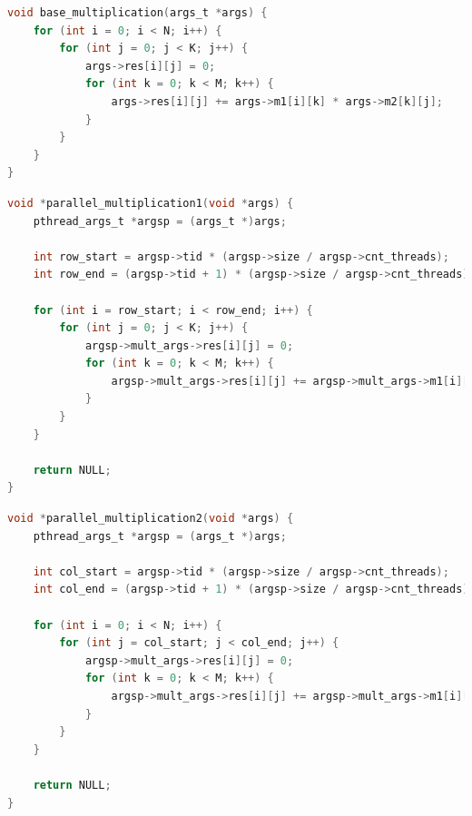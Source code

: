\documentclass[12pt]{report}
\begin{document}
\begin{lstlisting}[label=some-code,caption=Функция умножения матриц обычным способом, language=C]
void base_multiplication(args_t *args) {
	for (int i = 0; i < N; i++) {
		for (int j = 0; j < K; j++) {
			args->res[i][j] = 0;
			for (int k = 0; k < M; k++) {
				args->res[i][j] += args->m1[i][k] * args->m2[k][j];
			}
		}
	}
}
\end{lstlisting}

\begin{lstlisting}[label=some-code,caption=Функция умножения матриц параллельно. Способ №1,language=C]
void *parallel_multiplication1(void *args) {
	pthread_args_t *argsp = (args_t *)args;

	int row_start = argsp->tid * (argsp->size / argsp->cnt_threads);
	int row_end = (argsp->tid + 1) * (argsp->size / argsp->cnt_threads);

	for (int i = row_start; i < row_end; i++) {
		for (int j = 0; j < K; j++) {
			argsp->mult_args->res[i][j] = 0;
			for (int k = 0; k < M; k++) {
				argsp->mult_args->res[i][j] += argsp->mult_args->m1[i][k] * argsp->mult_args->m2[k][j];
			}
		}
	}

	return NULL;
}

\end{lstlisting}

\begin{lstlisting}[label=some-code,caption=Функция умножения матриц параллельно. Способ №2,language=C]
void *parallel_multiplication2(void *args) {
	pthread_args_t *argsp = (args_t *)args;

	int col_start = argsp->tid * (argsp->size / argsp->cnt_threads);
	int col_end = (argsp->tid + 1) * (argsp->size / argsp->cnt_threads);

	for (int i = 0; i < N; i++) {
		for (int j = col_start; j < col_end; j++) {
			argsp->mult_args->res[i][j] = 0;
			for (int k = 0; k < M; k++) {
				argsp->mult_args->res[i][j] += argsp->mult_args->m1[i][k] * argsp->mult_args->m2[k][j];
			}
		}
	}

	return NULL;
}
\end{lstlisting}
\end{document}
